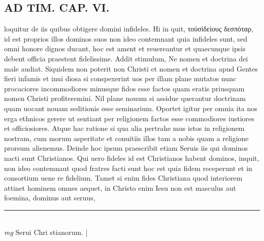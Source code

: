 \documentclass{article}
\begin{document}
\begin{pages}
\section*{AD TIM. CAP. VI. }
\marginpar{[ p.163 ]}\pstart loquitur de iis quibus obtigere domini infideles. Hi in quit, τούσἰδείους δεσπόταρ, id est proprios illos dominos suos non ideo contemnant quia infideles sunt, sed omni honore dignos ducant, hoc est ament et reuereantur et quaecunque ipsis debent officia praestent fidelissime. Addit stimulum, Ne nomen et doctrina dei male audiat. Siquidem non poterit non Christi et nomen et doctrina apud Gentes fieri infamis et inui diosa si conspexerint uos per illam plane mutatos nunc procaciores incommodiores minusque fidos esse factos quam eratis priusquam nomen Christi profiteremini. Nil plane nouum si assidue querantur doctrinam quam uocant nouam seditionis esse seminarium. Oportet igitur per omnia ita nos erga ethnicos gerere ut sentiant per religionem factos esse commodiores iustiores et officiosiores. Atque hac ratione si qua alia pertrahe mus istos in religionem nostram, cum morum asperitate et conuitiis illos tam a nobis quam a religione prorsum alienemus. Deinde hoc ipsum praescribit etiam Seruis iis qui dominos nacti sunt Christianos. Qui uero fideles id est Christianos habent dominos, inquit, non ideo contemnaut quod fratres facti sunt hoc est quia fidem receperunt et in consortium uene re fidelium. Tamet si enim fides Christiana quod interiorem attinet hominem omnes aequet, in Christo enim Iesu non est masculus aut foemina, dominus aut seruus,  \pend
\vspace{0.5cm}\noindent
\vspace{0.2cm}\rule{1cm}{0.2pt}\\ 
\hspace{0.2cm}\textit{mg}
\footnotesize Serui Chri stianorum. 
\normalsize| 

\end{pages}
\end{document}
